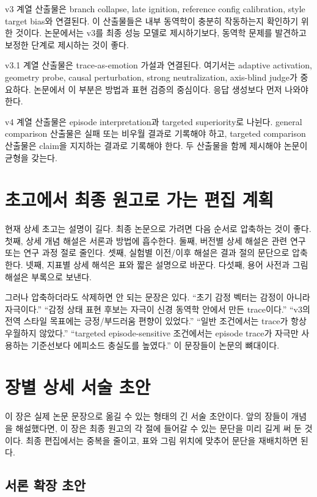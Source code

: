 \documentclass[11pt,a4paper]{article}
\begin{document}
v3 계열 산출물은 branch collapse, late ignition, reference config calibration, style target bias와 연결된다. 이 산출물들은 내부 동역학이 충분히 작동하는지 확인하기 위한 것이다. 논문에서는 v3를 최종 성능 모델로 제시하기보다, 동역학 문제를 발견하고 보정한 단계로 제시하는 것이 좋다.

v3.1 계열 산출물은 trace-as-emotion 가설과 연결된다. 여기서는 adaptive activation, geometry probe, causal perturbation, strong neutralization, axis-blind judge가 중요하다. 논문에서 이 부분은 방법과 표현 검증의 중심이다. 응답 생성보다 먼저 나와야 한다.

v4 계열 산출물은 episode interpretation과 targeted superiority로 나뉜다. general comparison 산출물은 실패 또는 비우월 결과로 기록해야 하고, targeted comparison 산출물은 claim을 지지하는 결과로 기록해야 한다. 두 산출물을 함께 제시해야 논문이 균형을 갖는다.

\section{초고에서 최종 원고로 가는 편집 계획}

현재 상세 초고는 설명이 길다. 최종 논문으로 가려면 다음 순서로 압축하는 것이 좋다. 첫째, 상세 개념 해설은 서론과 방법에 흡수한다. 둘째, 버전별 상세 해설은 관련 연구 또는 연구 과정 절로 줄인다. 셋째, 실험별 이전/이후 해설은 결과 절의 문단으로 압축한다. 넷째, 지표별 상세 해석은 표와 짧은 설명으로 바꾼다. 다섯째, 용어 사전과 그림 해설은 부록으로 보낸다.

그러나 압축하더라도 삭제하면 안 되는 문장은 있다. ``초기 감정 벡터는 감정이 아니라 자극이다.'' ``감정 상태 표현 후보는 자극이 신경 동역학 안에서 만든 trace이다.'' ``v3의 전역 스타일 목표에는 긍정/부드러움 편향이 있었다.'' ``일반 조건에서는 trace가 항상 우월하지 않았다.'' ``targeted episode-sensitive 조건에서는 episode trace가 자극만 사용하는 기준선보다 에피소드 충실도를 높였다.'' 이 문장들이 논문의 뼈대이다.

\section{장별 상세 서술 초안}

이 장은 실제 논문 문장으로 옮길 수 있는 형태의 긴 서술 초안이다. 앞의 장들이 개념을 해설했다면, 이 장은 최종 원고의 각 절에 들어갈 수 있는 문단을 미리 길게 써 둔 것이다. 최종 편집에서는 중복을 줄이고, 표와 그림 위치에 맞추어 문단을 재배치하면 된다.

\subsection{서론 확장 초안}
\end{document}
